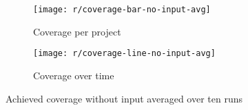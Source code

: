 \begin{figure}[htpb]
    \centering
    \begin{subfigure}{.95\textwidth}
        \texttt{[image: r/coverage-bar-no-input-avg]}
        \caption{Coverage per project}
        \label{fig:coverage_no_input_bar_avg}
    \end{subfigure}

    \bigskip

    \begin{subfigure}{.95\textwidth}
        \texttt{[image: r/coverage-line-no-input-avg]}
        \caption{Coverage over time}
        \label{fig:coverage_no_input_line_avg}
    \end{subfigure}

    \caption{Achieved coverage without input averaged over ten runs}
    \label{fig:coverage_no_input_avg}
\end{figure}

%
%

